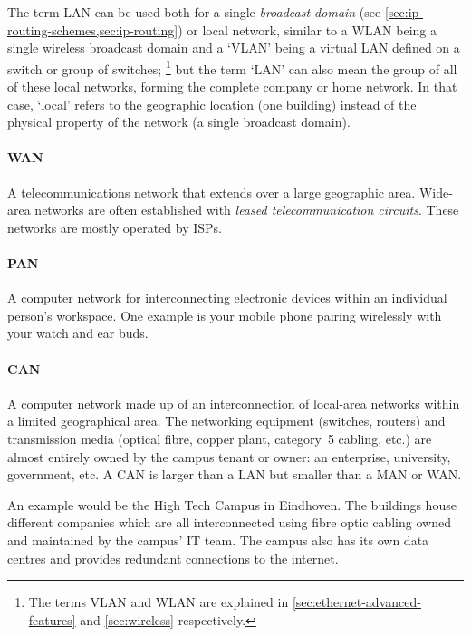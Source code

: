 The term \gls{LAN} can be used both for a single \emph{broadcast domain} (see \vref{sec:ip-routing-schemes,sec:ip-routing}) or local network, similar to a \acs{WLAN} being a single wireless broadcast domain and a `\acs{VLAN}' being a virtual \gls{LAN} defined on a switch or group of switches;%
   \footnote{The terms \acs{VLAN} and \acs{WLAN} are explained in \vref{sec:ethernet-advanced-features} and \vref{sec:wireless} respectively.}
but the term `\gls{LAN}' can also mean the group of all of these local networks, forming the complete company or home network.
In that case, `local' refers to the geographic location (one building) instead of the physical property of the network (a single broadcast domain).

\paragraph{\gls{WAN}}
A telecommunications network that extends over a large geographic area.
Wide-area networks are often established with \emph{leased telecommunication circuits}.
These networks are mostly operated by \glspl{ISP}.

\paragraph{\gls{PAN}}
A computer network for interconnecting electronic devices within an individual person's workspace.
One example is your mobile phone pairing wirelessly with your watch and ear buds.

\paragraph{\gls{CAN}}
A computer network made up of an interconnection of local-area networks within a limited geographical area.
The networking equipment (switches, routers) and transmission media (optical fibre, copper plant, category~5 cabling, etc.) are almost entirely owned by the campus tenant or owner: an enterprise, university, government, etc.
A \acl{CAN} is larger than a \acl{LAN} but smaller than a \acs{MAN} or \gls{WAN}.

An example would be the High Tech Campus in Eindhoven.
The buildings house different companies which are all interconnected using fibre optic cabling owned and maintained by the campus' \acs{IT} team.
The campus also has its own data centres and provides redundant connections to the internet.

